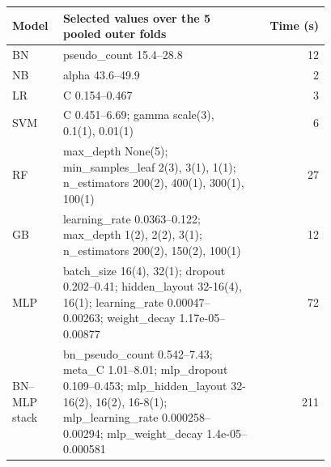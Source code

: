 \begin{tabular}{p{0.16\linewidth}p{0.62\linewidth}r}
\toprule
Model & Selected values over the 5 pooled outer folds & Time (s) \\
\midrule
BN & pseudo\_count 15.4--28.8 & 12 \\
NB & alpha 43.6--49.9 & 2 \\
LR & C 0.154--0.467 & 3 \\
SVM & C 0.451--6.69; gamma scale(3), 0.1(1), 0.01(1) & 6 \\
RF & max\_depth None(5); min\_samples\_leaf 2(3), 3(1), 1(1); n\_estimators 200(2), 400(1), 300(1), 100(1) & 27 \\
GB & learning\_rate 0.0363--0.122; max\_depth 1(2), 2(2), 3(1); n\_estimators 200(2), 150(2), 100(1) & 12 \\
MLP & batch\_size 16(4), 32(1); dropout 0.202--0.41; hidden\_layout 32-16(4), 16(1); learning\_rate 0.00047--0.00263; weight\_decay 1.17e-05--0.00877 & 72 \\
BN--MLP stack & bn\_pseudo\_count 0.542--7.43; meta\_C 1.01--8.01; mlp\_dropout 0.109--0.453; mlp\_hidden\_layout 32-16(2), 16(2), 16-8(1); mlp\_learning\_rate 0.000258--0.00294; mlp\_weight\_decay 1.4e-05--0.000581 & 211 \\
\bottomrule
\end{tabular}
